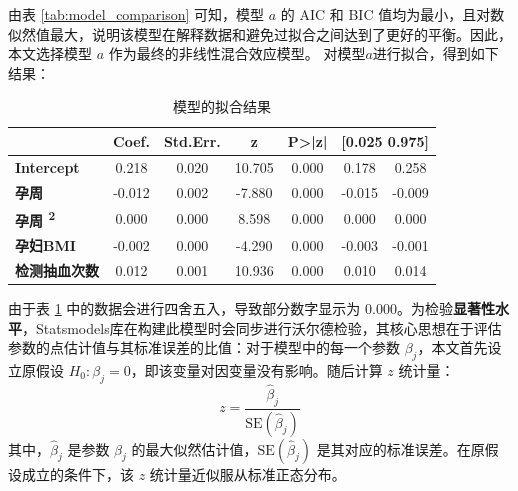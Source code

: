 由表 \ref{tab:model_comparison} 可知，模型 $a$ 的 AIC 和 BIC 值均为最小，且对数似然值最大，说明该模型在解释数据和避免过拟合之间达到了更好的平衡。因此，本文选择模型 $a$ 作为最终的非线性混合效应模型。
对模型$a$进行拟合，得到如下结果：

\begin{table}[H]
    \centering
    \caption{模型的拟合结果}
    \label{tab:model_fit}
    \begin{tabular}{l c c c c c c}
        \toprule
                                        & \textbf{Coef.} & \textbf{Std.Err.} & \textbf{z} & \textbf{P>|z|} & \multicolumn{2}{c}{\textbf{[0.025 0.975]}}          \\
        \midrule
        \textbf{Intercept}              & 0.218          & 0.020             & 10.705     & 0.000          & 0.178                                      & 0.258  \\
        \textbf{孕周}                     & -0.012         & 0.002             & -7.880     & 0.000          & -0.015                                     & -0.009 \\
        \textbf{孕周 \textsuperscript{2}} & 0.000          & 0.000             & 8.598      & 0.000          & 0.000                                      & 0.000  \\
        \textbf{孕妇BMI}                  & -0.002         & 0.000             & -4.290     & 0.000          & -0.003                                     & -0.001 \\
        \textbf{检测抽血次数}                 & 0.012          & 0.001             & 10.936     & 0.000          & 0.010                                      & 0.014  \\
        \bottomrule
    \end{tabular}
\end{table}

由于表 \ref{tab:model_fit} 中的数据会进行四舍五入，导致部分数字显示为 $0.000$。为检验\textbf{显著性水平}，Statsmodels库在构建此模型时会同步进行沃尔德检验，其核心思想在于评估参数的点估计值与其标准误差的比值：对于模型中的每一个参数 $\beta_j$，本文首先设立原假设 $H_0: \beta_j=0$，即该变量对因变量没有影响。随后计算 $z$ 统计量：
\begin{equation}
    z = \frac{\hat{\beta}_j}{\text{SE}(\hat{\beta}_j)}
\end{equation}
其中，$\hat{\beta}_j$ 是参数 $\beta_j$ 的最大似然估计值，$\text{SE}(\hat{\beta}_j)$ 是其对应的标准误差。在原假设成立的条件下，该 $z$ 统计量近似服从标准正态分布。

